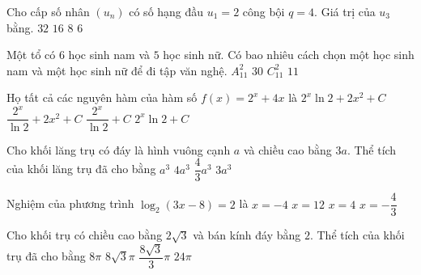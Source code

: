 \begin{ex}%
Cho cấp số nhân $\left(u_n\right)$ có số hạng đầu $u_1=2$ công bội $q=4$. Giá trị của $u_3$ bằng.
\choice
{\True $32$}
{$16$}
{$8$}
{$6$}

\end{ex}
\begin{ex}%
Một tổ có $6$ học sinh nam và $5$ học sinh nữ. Có bao nhiêu cách chọn một học sinh nam và một học sinh nữ để đi tập văn nghệ.
\choice
{$A_{11}^2$}
{\True $30$}
{$C_{11}^2$}
{$11$}

\end{ex}
\begin{ex}%
Họ tất cả các nguyên hàm của hàm số $f(x)=2^{x}+4 x$ là
\choice
{$2^{x} \ln 2+2 x^2+C$}
{\True $\dfrac{2^{x}}{\ln 2}+2 x^2+C$}
{$\dfrac{2^{x}}{\ln 2}+C$}
{$2^{x} \ln 2+C$}

\end{ex}
\begin{ex}%
Cho khối lăng trụ có đáy là hình vuông cạnh $a$ và chiều cao bằng $3 a$. Thể tích của khối lăng trụ đã cho bằng
\choice
{$a^3$}
{$4 a^3$}
{$\dfrac{4}{3} a^3$}
{\True $3 a^3$}

\end{ex}
\begin{ex}%
Nghiệm của phương trình $\log_2(3 x-8)=2$ là
\choice
{$x=-4$}
{$x=12$}
{\True $x=4$}
{$x=-\dfrac{4}{3}$}

\end{ex}
\begin{ex}%
Cho khối trụ có chiều cao bằng $2\sqrt{3}$ và bán kính đáy bằng $2$. Thể tích của khối trụ đã cho bằng
\choice
{$8\pi$}
{\True $8\sqrt{3} \pi$}
{$\dfrac{8\sqrt{3}}{3} \pi$}
{$24\pi$}

\end{ex}
\begin{ex}%
{\vspace{-0.5cm}

}

\end{ex}

